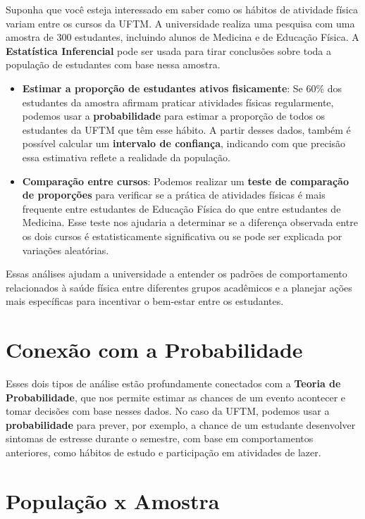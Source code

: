 \documentclass[
]{book}
\begin{document}
Suponha que você esteja interessado em saber como os hábitos de atividade física variam entre os cursos da UFTM. A universidade realiza uma pesquisa com uma amostra de 300 estudantes, incluindo alunos de Medicina e de Educação Física. A \textbf{Estatística Inferencial} pode ser usada para tirar conclusões sobre toda a população de estudantes com base nessa amostra.

\begin{itemize}
\item
  \textbf{Estimar a proporção de estudantes ativos fisicamente}: Se 60\% dos estudantes da amostra afirmam praticar atividades físicas regularmente, podemos usar a \textbf{probabilidade} para estimar a proporção de todos os estudantes da UFTM que têm esse hábito. A partir desses dados, também é possível calcular um \textbf{intervalo de confiança}, indicando com que precisão essa estimativa reflete a realidade da população.
\item
  \textbf{Comparação entre cursos}: Podemos realizar um \textbf{teste de comparação de proporções} para verificar se a prática de atividades físicas é mais frequente entre estudantes de Educação Física do que entre estudantes de Medicina. Esse teste nos ajudaria a determinar se a diferença observada entre os dois cursos é estatisticamente significativa ou se pode ser explicada por variações aleatórias.
\end{itemize}

Essas análises ajudam a universidade a entender os padrões de comportamento relacionados à saúde física entre diferentes grupos acadêmicos e a planejar ações mais específicas para incentivar o bem-estar entre os estudantes.

\section{Conexão com a Probabilidade}\label{conexuxe3o-com-a-probabilidade}

Esses dois tipos de análise estão profundamente conectados com a \textbf{Teoria de Probabilidade}, que nos permite estimar as chances de um evento acontecer e tomar decisões com base nesses dados. No caso da UFTM, podemos usar a \textbf{probabilidade} para prever, por exemplo, a chance de um estudante desenvolver sintomas de estresse durante o semestre, com base em comportamentos anteriores, como hábitos de estudo e participação em atividades de lazer.

\section{População x Amostra}\label{populauxe7uxe3o-x-amostra}
\end{document}
